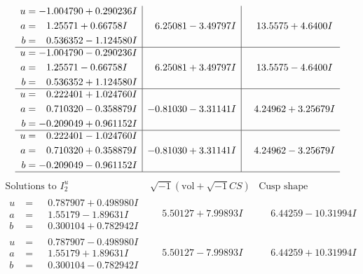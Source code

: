 \documentclass[1p]{elsarticle_modified}
\theoremstyle{definition}
\newcommand{\I}{\sqrt{-1}}
\begin{document}
$$\begin{array}{c|c|c}
\begin{aligned}
u &= -1.004790 + 0.290236 I \\
a &= \phantom{-}1.25571 + 0.66758 I \\
b &= \phantom{-}0.536352 - 1.124580 I\end{aligned}
 & \phantom{-}6.25081 - 3.49797 I & \phantom{-}13.5575 + 4.6400 I \\ \hline\begin{aligned}
u &= -1.004790 - 0.290236 I \\
a &= \phantom{-}1.25571 - 0.66758 I \\
b &= \phantom{-}0.536352 + 1.124580 I\end{aligned}
 & \phantom{-}6.25081 + 3.49797 I & \phantom{-}13.5575 - 4.6400 I \\ \hline\begin{aligned}
u &= \phantom{-}0.222401 + 1.024760 I \\
a &= \phantom{-}0.710320 - 0.358879 I \\
b &= -0.209049 + 0.961152 I\end{aligned}
 & -0.81030 - 3.31141 I & \phantom{-}4.24962 + 3.25679 I \\ \hline\begin{aligned}
u &= \phantom{-}0.222401 - 1.024760 I \\
a &= \phantom{-}0.710320 + 0.358879 I \\
b &= -0.209049 - 0.961152 I\end{aligned}
 & -0.81030 + 3.31141 I & \phantom{-}4.24962 - 3.25679 I\\
 \hline 
 \end{array}$$\newpage$$\begin{array}{c|c|c}  
\text{Solutions to }I^u_{2}& \I (\text{vol} + \sqrt{-1}CS) & \text{Cusp shape}\\
 \hline 
\begin{aligned}
u &= \phantom{-}0.787907 + 0.498980 I \\
a &= \phantom{-}1.55179 - 1.89631 I \\
b &= \phantom{-}0.300104 + 0.782942 I\end{aligned}
 & \phantom{-}5.50127 + 7.99893 I & \phantom{-}6.44259 - 10.31994 I \\ \hline\begin{aligned}
u &= \phantom{-}0.787907 - 0.498980 I \\
a &= \phantom{-}1.55179 + 1.89631 I \\
b &= \phantom{-}0.300104 - 0.782942 I\end{aligned}
 & \phantom{-}5.50127 - 7.99893 I & \phantom{-}6.44259 + 10.31994 I \\ \hline\begin{aligned}

\end{aligned}
\end{array}$$
\end{document}
